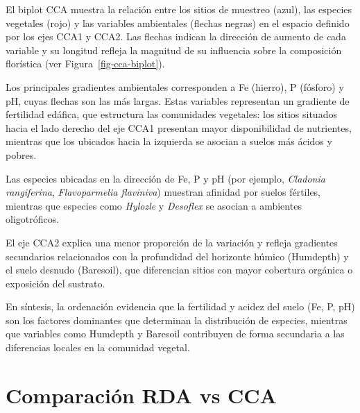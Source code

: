 \documentclass[
  spanish,
  11pt,
  a4paper,
  DIV=11,
  numbers=noendperiod]{scrartcl}
\begin{document}
El biplot CCA muestra la relación entre los sitios de muestreo (azul),
las especies vegetales (rojo) y las variables ambientales (flechas
negras) en el espacio definido por los ejes CCA1 y CCA2. Las flechas
indican la dirección de aumento de cada variable y su longitud refleja
la magnitud de su influencia sobre la composición florística (ver
Figura~\ref{fig-cca-biplot}).

Los principales gradientes ambientales corresponden a Fe (hierro), P
(fósforo) y pH, cuyas flechas son las más largas. Estas variables
representan un gradiente de fertilidad edáfica, que estructura las
comunidades vegetales: los sitios situados hacia el lado derecho del eje
CCA1 presentan mayor disponibilidad de nutrientes, mientras que los
ubicados hacia la izquierda se asocian a suelos más ácidos y pobres.

Las especies ubicadas en la dirección de Fe, P y pH (por ejemplo,
\emph{Cladonia rangiferina}, \emph{Flavoparmelia flaviniva}) muestran
afinidad por suelos fértiles, mientras que especies como \emph{Hylozle}
y \emph{Desoflex} se asocian a ambientes oligotróficos.

El eje CCA2 explica una menor proporción de la variación y refleja
gradientes secundarios relacionados con la profundidad del horizonte
húmico (Humdepth) y el suelo desnudo (Baresoil), que diferencian sitios
con mayor cobertura orgánica o exposición del sustrato.

En síntesis, la ordenación evidencia que la fertilidad y acidez del
suelo (Fe, P, pH) son los factores dominantes que determinan la
distribución de especies, mientras que variables como Humdepth y
Baresoil contribuyen de forma secundaria a las diferencias locales en la
comunidad vegetal.

\section{Comparación RDA vs CCA}\label{comparaciuxf3n-rda-vs-cca}
\end{document}
